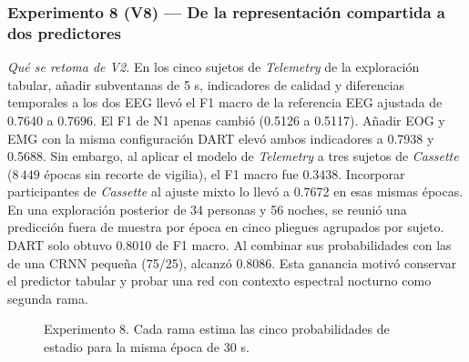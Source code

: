 \documentclass[conference]{IEEEtran}
\begin{document}
\subsubsection{Experimento 8 (V8) --- De la representación compartida a dos predictores}

\textit{Qué se retoma de V2.} En los cinco sujetos de \textit{Telemetry} de la exploración tabular, añadir subventanas de 5 s, indicadores de calidad y diferencias temporales a los dos EEG llevó el F1 macro de la referencia EEG ajustada de 0.7640 a 0.7696. El F1 de N1 apenas cambió (0.5126 a 0.5117). Añadir EOG y EMG con la misma configuración DART elevó ambos indicadores a 0.7938 y 0.5688. Sin embargo, al aplicar el modelo de \textit{Telemetry} a tres sujetos de \textit{Cassette} ($8\,449$ épocas sin recorte de vigilia), el F1 macro fue 0.3438. Incorporar participantes de \textit{Cassette} al ajuste mixto lo llevó a 0.7672 en esas mismas épocas. En una exploración posterior de 34 personas y 56 noches, se reunió una predicción fuera de muestra por época en cinco pliegues agrupados por sujeto. DART solo obtuvo 0.8010 de F1 macro. Al combinar sus probabilidades con las de una CRNN pequeña (75/25), alcanzó 0.8086. Esta ganancia motivó conservar el predictor tabular y probar una red con contexto espectral nocturno como segunda rama.

\begin{figure}[tbp]
\centering
{}
\caption{Experimento 8. Cada rama estima las cinco probabilidades de estadio para la misma época de 30 s.}
\label{fig:arq_v8}
\end{figure}
\end{document}
